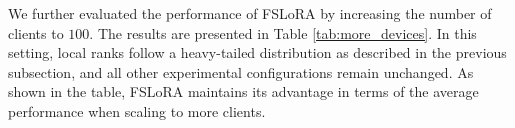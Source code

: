 \documentclass{article} %
\theoremstyle{plain}
\theoremstyle{definition}
\begin{document}
We further evaluated the performance of FSLoRA by increasing the number of clients to $100$. The results are presented in Table \ref{tab:more_devices}. In this setting, local ranks follow a heavy-tailed distribution as described in the previous subsection, and all other experimental configurations remain unchanged. As shown in the table, FSLoRA maintains its advantage in terms of the average performance when scaling to more clients. 


\begin{table}[h]
\centering
\caption{Accuracy comparison when the number of clients is $N=100$. FSLoRA maintains its advantage in terms of the average accuracy.}
\small
{}
\label{tab:more_devices}
\end{table}
\end{document}
